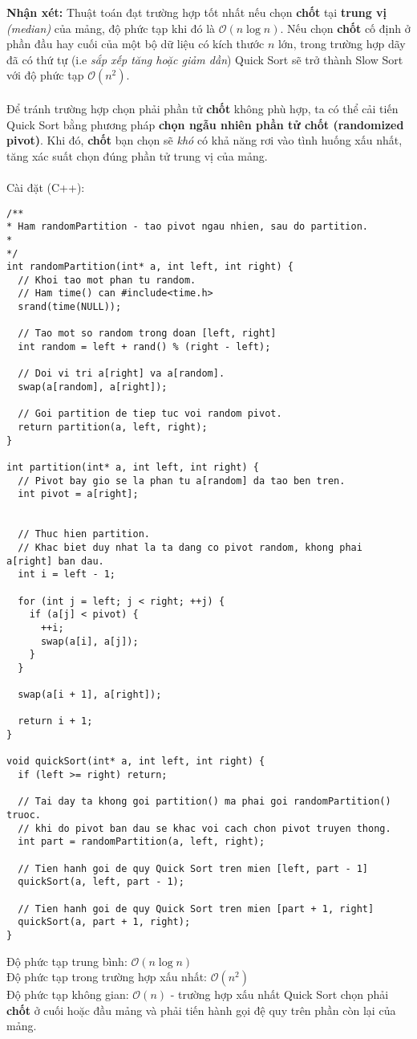 \documentclass[]{article}
\begin{document}
\textbf{Nhận xét:} Thuật toán đạt trường hợp tốt nhất nếu chọn \textbf{chốt} tại \textbf{trung vị} \textit{(median)} của mảng, độ phức tạp khi đó là $\mathcal{O}(n \log n)$. Nếu chọn \textbf{chốt} cố định ở phần đầu hay cuối của một bộ dữ liệu có kích thước $n$ lớn, trong trường hợp dãy đã có thứ tự (i.e \textit{sắp xếp tăng hoặc giảm dần}) Quick Sort sẽ trở thành Slow Sort với độ phức tạp $\mathcal{O}(n^2)$.
\\\\
Để tránh trường hợp chọn phải phần tử \textbf{chốt} không phù hợp, ta có thể cải tiến Quick Sort bằng phương pháp \textbf{chọn ngẫu nhiên phần tử chốt (randomized pivot)}. Khi đó, \textbf{chốt} bạn chọn sẽ \textit{khó} có khả năng rơi vào tình huống xấu nhất, tăng xác suất chọn đúng phần tử trung vị của mảng. \cite{LMHoang}
\label{subsec:randompivot}
\\\\
Cài đặt (C++):
\begin{lstlisting}
/**
* Ham randomPartition - tao pivot ngau nhien, sau do partition.
*
*/
int randomPartition(int* a, int left, int right) {
  // Khoi tao mot phan tu random.
  // Ham time() can #include<time.h>
  srand(time(NULL));

  // Tao mot so random trong doan [left, right]
  int random = left + rand() % (right - left);

  // Doi vi tri a[right] va a[random].
  swap(a[random], a[right]);

  // Goi partition de tiep tuc voi random pivot.
  return partition(a, left, right);
}

int partition(int* a, int left, int right) {
  // Pivot bay gio se la phan tu a[random] da tao ben tren.
  int pivot = a[right];


  // Thuc hien partition.
  // Khac biet duy nhat la ta dang co pivot random, khong phai a[right] ban dau.
  int i = left - 1;

  for (int j = left; j < right; ++j) {
    if (a[j] < pivot) {
      ++i;
      swap(a[i], a[j]);
    }
  }

  swap(a[i + 1], a[right]);

  return i + 1;
}

void quickSort(int* a, int left, int right) {
  if (left >= right) return;

  // Tai day ta khong goi partition() ma phai goi randomPartition() truoc.
  // khi do pivot ban dau se khac voi cach chon pivot truyen thong.
  int part = randomPartition(a, left, right);

  // Tien hanh goi de quy Quick Sort tren mien [left, part - 1]
  quickSort(a, left, part - 1);

  // Tien hanh goi de quy Quick Sort tren mien [part + 1, right]
  quickSort(a, part + 1, right);
}
\end{lstlisting}
Độ phức tạp trung bình: $\mathcal{O}(n \log n)$
\\
Độ phức tạp trong trường hợp xấu nhất: $\mathcal{O}(n^2)$
\\
Độ phức tạp không gian: $\mathcal{O}(n)$ - trường hợp xấu nhất Quick Sort chọn phải \textbf{chốt} ở cuối hoặc đầu mảng và phải tiến hành gọi đệ quy trên phần còn lại của mảng.
\end{document}
